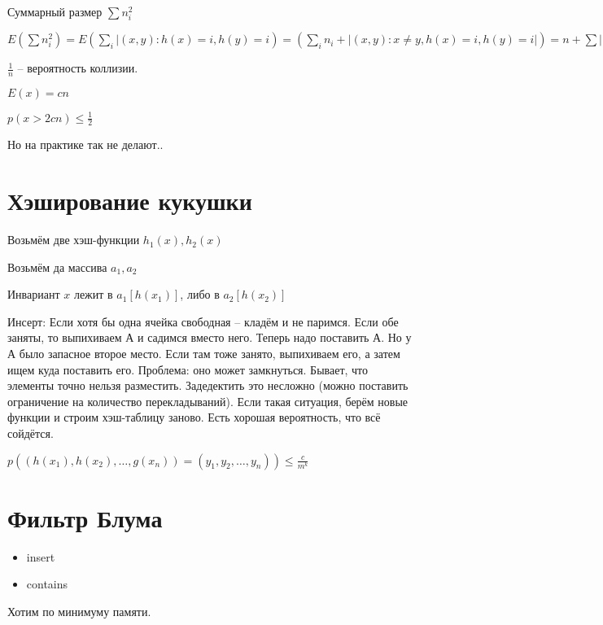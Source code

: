 \documentclass{book}
\theoremstyle{definition}
\begin{document}
Суммарный размер  $\sum n_i^2$

$E\left( \sum n_i^2 \right)  = E\left( \sum\limits_i | (x,y): h(x) = i, h(y) = i \right)  = \left( \sum\limits_i n_i + | (x,y): x\neq y, h(x) = i, h(y)=i| \right) = n + \sum|(x,y):x\neq y, h(x) = i, h(y) = i| = n+n^2\cdot \frac{1}{n} = O(n) $ 

$\frac{1}{n}$ -- вероятность коллизии.

$E(x) = cn$

$p\left( x>2cn \right) \leqslant \frac{1}{2}$ 

Но на практике так не делают..

\section{Хэширование кукушки}

Возьмём две хэш-функции $h_1(x), h_2(x)$

Возьмём да массива $a_1, a_2$

Инвариант $x$ лежит в  $a_1[h(x_1)]$, либо в $a_2[h(x_2)]$

Инсерт: Если хотя бы одна ячейка свободная -- кладём и не паримся. Если обе заняты, то выпихиваем А и садимся вместо него. Теперь надо поставить А. Но у А было запасное второе место. Если там тоже занято, выпихиваем его, а затем ищем куда поставить его. Проблема: оно может замкнуться. Бывает, что элементы точно нельзя разместить. Задедектить это несложно (можно поставить ограничение на количество перекладываний). Если такая ситуация, берём новые функции и строим хэш-таблицу заново. Есть хорошая  вероятность, что всё сойдётся.

\begin{definition}
    [$k$-универсальные]

    $p\left( \left( h(x_1), h(x_2), \ldots, g(x_{n} ) \right) =(y_1, y_2, \ldots, y_{n}) \right) \leqslant \frac{c}{m^k}$
\end{definition}


\section{Фильтр Блума}

\begin{itemize}
    \item insert
    \item contains
\end{itemize}

Хотим по минимуму памяти.
\end{document}
